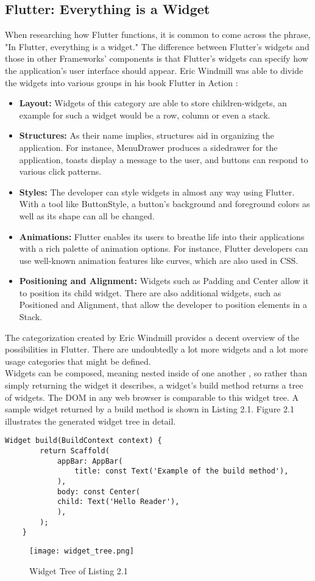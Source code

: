 \subsection{Flutter: Everything is a Widget}
When researching how Flutter functions, it is common to come across the phrase, "In Flutter, everything is a widget." The difference between Flutter's widgets and those in other Frameworks' components is that Flutter's widgets can specify how the application's user interface should appear. Eric Windmill was able to divide the widgets into various groups in his book Flutter in Action \cite[p. 58]{.flutterinaction}:

\begin{itemize}
	\item \textbf{Layout:} 
	Widgets of this category are able to store children-widgets, an example for such a widget would be a row, column or even a stack.  
	\item \textbf{Structures:} 
	As their name implies, structures aid in organizing the application.
	For instance, MenuDrawer produces a sidedrawer for the application, toasts display a message to the user, and buttons can respond to various click patterns. 
	\item \textbf{Styles:} 
	The developer can style widgets in almost any way using Flutter. With a tool like ButtonStyle, a button's background and foreground colors as well as its shape can all be changed.
	\item \textbf{Animations:} 
	Flutter enables its users to breathe life into their applications with a rich palette of animation options. For instance, Flutter developers can use well-known animation features like curves, which are also used in CSS. 
	\item \textbf{Positioning and Alignment:} 
	Widgets such as Padding and Center allow it to position its child widget. There are also additional widgets, such as Positioned and Alignment, that allow the developer to position elements in a Stack.
\end{itemize}
\noindent 
The categorization created by Eric Windmill provides a decent overview of the possibilities in Flutter. There are undoubtedly a lot more widgets and a lot more usage categories that might be defined.
\newline \\
Widgets can be composed, meaning nested inside of one another \cite[p. 61]{.flutterinaction}, so rather than simply returning the widget it describes, a widget's build method returns a tree of widgets. The DOM in any web browser is comparable to this widget tree. A sample widget returned by a build method is shown in Listing 2.1. Figure 2.1 illustrates the generated widget tree in detail.
\begin{lstlisting}[caption=Flutter Scaffold Example]
	Widget build(BuildContext context) {
		return Scaffold(
			appBar: AppBar(
				title: const Text('Example of the build method'),
			),
			body: const Center(
			child: Text('Hello Reader'),
			),
		);
	}
\end{lstlisting}
\begin{figure}[H]
	\centering
	\texttt{[image: widget\_tree.png]}
	\caption[Widget Tree of Listing 2.1]{Widget Tree of Listing 2.1}
\end{figure}
